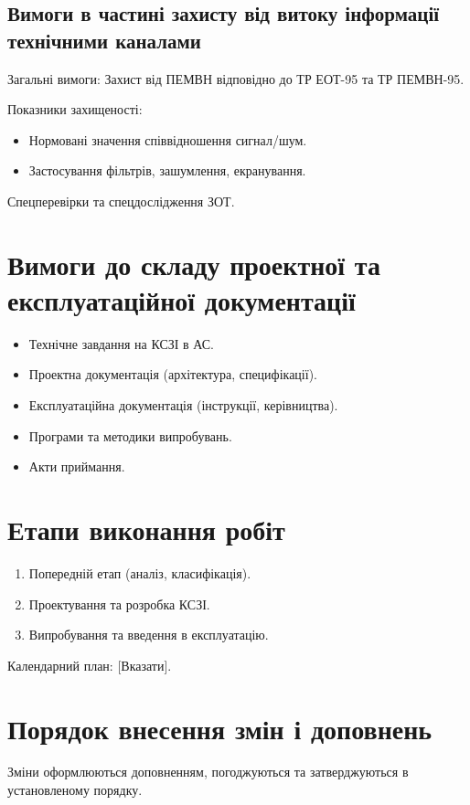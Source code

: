 \documentclass{article}
\begin{document}
\subsection{Вимоги в частині захисту від витоку інформації технічними каналами}
Загальні вимоги: Захист від ПЕМВН відповідно до ТР ЕОТ-95 та ТР ПЕМВН-95.

Показники захищеності:
\begin{itemize}
    \item Нормовані значення співвідношення сигнал/шум.
    \item Застосування фільтрів, зашумлення, екранування.
\end{itemize}

Спецперевірки та спецдослідження ЗОТ.

\section{Вимоги до складу проектної та експлуатаційної документації}
\begin{itemize}
    \item Технічне завдання на КСЗІ в АС.
    \item Проектна документація (архітектура, специфікації).
    \item Експлуатаційна документація (інструкції, керівництва).
    \item Програми та методики випробувань.
    \item Акти приймання.
\end{itemize}

\section{Етапи виконання робіт}
\begin{enumerate}
    \item Попередній етап (аналіз, класифікація).
    \item Проектування та розробка КСЗІ.
    \item Випробування та введення в експлуатацію.
\end{enumerate}

Календарний план: [Вказати].

\section{Порядок внесення змін і доповнень}
Зміни оформлюються доповненням, погоджуються та затверджуються в установленому порядку.
\end{document}
